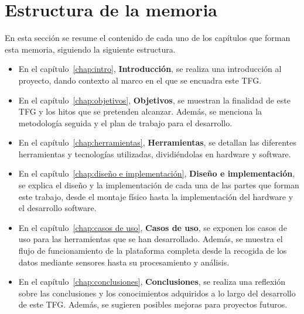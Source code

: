 \documentclass[a4paper, 12pt, oneside]{book}
\begin{document}
\section{Estructura de la memoria}
\label{sec:estructura}

En esta sección se resume el contenido de cada uno de los capítulos que forman esta memoria, siguiendo la siguiente estructura.

\begin{itemize}
\item En el capítulo~\ref{chap:intro}, \textbf{Introducción}, se realiza una introducción al proyecto, dando contexto al marco en el que se encuadra este TFG.

\item En el capítulo~\ref{chap:objetivos}, \textbf{Objetivos}, se muestran la finalidad de este TFG y los hitos que se pretenden alcanzar. Además, se menciona la metodología seguida y el plan de trabajo para el desarrollo.

\item En el capítulo~\ref{chap:herramientas}, \textbf{Herramientas}, se detallan las diferentes herramientas y tecnologías utilizadas, dividiéndolas en hardware y software.

\item En el capítulo~\ref{chap:diseño e implementación}, \textbf{Diseño e implementación}, se explica el diseño y la implementación de cada una de las partes que forman este trabajo, desde el montaje físico hasta la implementación del hardware y el desarrollo software.

\item En el capítulo~\ref{chap:casos de uso}, \textbf{Casos de uso}, se exponen los casos de uso para las herramientas que se han desarrollado. Además, se muestra el flujo de funcionamiento de la plataforma completa desde la recogida de los datos mediante sensores hasta su procesamiento y análisis.

\item En el capítulo~\ref{chap:conclusiones}, \textbf{Conclusiones},  se realiza una reflexión sobre las conclusiones y los conocimientos adquiridos a lo largo del desarrollo de este TFG. Además, se sugieren posibles mejoras para proyectos futuros.
\end{itemize}

%
%
%  
%  
%  
\end{document}
